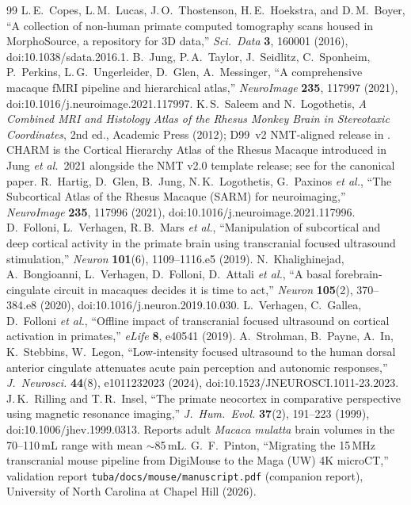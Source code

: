 \documentclass{compactarticle}
\begin{document}

\begin{thebibliography}{99}
 L.\,E.~Copes, L.\,M.~Lucas,
  J.\,O.~Thostenson, H.\,E.~Hoekstra, and D.\,M.~Boyer,
  ``A collection of non-human primate computed tomography scans housed
  in MorphoSource, a repository for 3D data,''
  \emph{Sci.\ Data} {\bf 3}, 160001 (2016), doi:10.1038/sdata.2016.1.
 B.~Jung, P.\,A.~Taylor, J.~Seidlitz, C.~Sponheim,
  P.~Perkins, L.\,G.~Ungerleider, D.~Glen, A.~Messinger,
  ``A comprehensive macaque fMRI pipeline and hierarchical atlas,''
  \emph{NeuroImage} {\bf 235}, 117997 (2021),
  doi:10.1016/j.neuroimage.2021.117997.
 K.\,S.~Saleem and N.~Logothetis, \emph{A Combined MRI and
  Histology Atlas of the Rhesus Monkey Brain in Stereotaxic
  Coordinates}, 2nd ed., Academic Press (2012); D99~v2 NMT-aligned
  release in \cite{nmt-v2}.
 CHARM is the Cortical Hierarchy Atlas of the Rhesus
  Macaque introduced in Jung \emph{et al.}~2021 alongside the NMT v2.0
  template release; see \cite{nmt-v2} for the canonical paper.
 R.~Hartig, D.~Glen, B.~Jung, N.\,K.~Logothetis,
  G.~Paxinos \emph{et al.},
  ``The Subcortical Atlas of the Rhesus Macaque (SARM) for
  neuroimaging,'' \emph{NeuroImage} {\bf 235}, 117996 (2021),
  doi:10.1016/j.neuroimage.2021.117996.
 D.~Folloni, L.~Verhagen, R.\,B.~Mars \emph{et al.},
  ``Manipulation of subcortical and deep cortical activity in the
  primate brain using transcranial focused ultrasound stimulation,''
  \emph{Neuron} {\bf 101}(6), 1109--1116.e5 (2019).
 N.~Khalighinejad, A.~Bongioanni, L.~Verhagen,
  D.~Folloni, D.~Attali \emph{et al.},
  ``A basal forebrain-cingulate circuit in macaques decides it is time
  to act,'' \emph{Neuron} {\bf 105}(2), 370--384.e8 (2020),
  doi:10.1016/j.neuron.2019.10.030.
 L.~Verhagen, C.~Gallea, D.~Folloni \emph{et al.},
  ``Offline impact of transcranial focused ultrasound on cortical
  activation in primates,'' \emph{eLife} {\bf 8}, e40541 (2019).
 A.~Strohman, B.~Payne, A.~In, K.~Stebbins, W.~Legon,
  ``Low-intensity focused ultrasound to the human dorsal anterior
  cingulate attenuates acute pain perception and autonomic responses,''
  \emph{J.\ Neurosci.} {\bf 44}(8), e1011232023 (2024),
  doi:10.1523/JNEUROSCI.1011-23.2023.
 J.\,K.~Rilling and T.\,R.~Insel,
  ``The primate neocortex in comparative perspective using magnetic
  resonance imaging,''
  \emph{J.\ Hum.\ Evol.} {\bf 37}(2), 191--223 (1999),
  doi:10.1006/jhev.1999.0313. Reports adult \emph{Macaca mulatta}
  brain volumes in the 70--110\,mL range with mean ${\sim}$85\,mL.
 G.~F.~Pinton,
  ``Migrating the 15\,MHz transcranial mouse pipeline from DigiMouse to
  the Maga (UW) 4K microCT,'' validation report
  \texttt{tuba/docs/mouse/manuscript.pdf} (companion report),
  University of North Carolina at Chapel Hill (2026).
\end{thebibliography}
\end{document}
